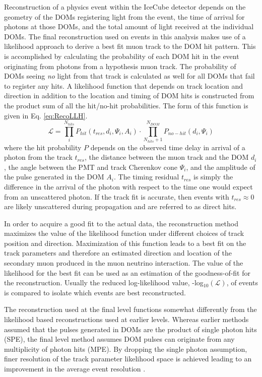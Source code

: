 \documentclass{gatech-thesis}
\begin{document}
Reconstruction of a physics event within the IceCube detector depends on the geometry of the DOMs registering light from the event, the time of arrival for photons at those DOMs, and the total amount of light received at the individual DOMs. The final reconstruction used on events in this analysis makes use of a likelihood approach to derive a best fit muon track to the DOM hit pattern. This is accomplished by calculating the probability of each DOM hit in the event originating from photons from a hypothesis muon track. The probability of DOMs seeing \textit{no} light from that track is calculated as well for all DOMs that fail to register any hits. A likelihood function that depends on track location and direction in addition to the location and timing of DOM hits is constructed from the product sum of all the hit/no-hit probabilities. The form of this function is given in Eq. \ref{eq:RecoLLH}.
\begin{equation}
\label{eq:RecoLLH}
\mathcal{L} = \prod_{i}^{N_{hits}} P_{hit}(t_{res},d_i,\Psi_i,A_i) \cdot \prod_{N_{hits}+1}^{N_{DOM}} P_{no-hit}(d_i,\Psi_i)
\end{equation}
where the hit probability $P$ depends on the observed time delay in arrival of a photon from the track $t_{res}$, the distance between the muon track and the DOM $d_i$, the angle between the PMT and track Cherenkov cone $\Psi_i$, and the amplitude of the pulse generated in the DOM $A_i$. The timing residual $t_{res}$ is simply the difference in the arrival of the photon with respect to the time one would expect from an unscattered photon. If the track fit is accurate, then events with $t_{res} \approx 0$ are likely unscattered during propagation and are referred to as direct hits.

In order to acquire a good fit to the actual data, the reconstruction method maximizes the value of the likelihood function under different choices of track position and direction. Maximization of this function leads to a best fit on the track parameters and therefore an estimated direction and location of the secondary muon produced in the muon neutrino interaction. The value of the likelihood for the best fit can be used as an estimation of the goodness-of-fit for the reconstruction. Usually the reduced log-likelihood value, -log$_{10}(\mathcal{L})$, of events is compared to isolate which events are best reconstructed.

The reconstruction used at the final level functions somewhat differently from the likelihood based reconstructions used at earlier levels. Whereas earlier methods assumed that the pulses generated in DOMs are the product of single photon hits (SPE), the final level method assumes DOM pulses can originate from any multiplicity of photon hits (MPE). By dropping the single photon assumption, finer resolution of the track parameter likelihood space is achieved leading to an improvement in the average event resolution \cite{2004NIMPA.524..169A}.
\end{document}
